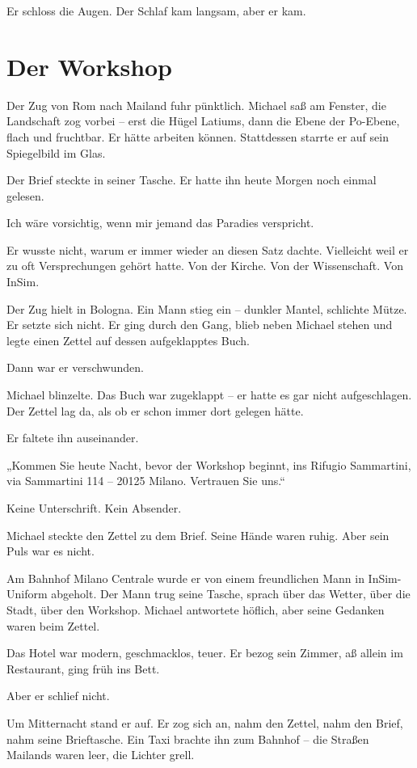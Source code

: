 \documentclass[
]{article}
\begin{document}
Er schloss die Augen. Der Schlaf kam langsam, aber er kam.

\section{Der Workshop}\label{der-workshop}

Der Zug von Rom nach Mailand fuhr pünktlich. Michael saß am Fenster, die Landschaft zog vorbei -- erst die Hügel Latiums, dann die Ebene der Po-Ebene, flach und fruchtbar. Er hätte arbeiten können. Stattdessen starrte er auf sein Spiegelbild im Glas.

Der Brief steckte in seiner Tasche. Er hatte ihn heute Morgen noch einmal gelesen.

Ich wäre vorsichtig, wenn mir jemand das Paradies verspricht.

Er wusste nicht, warum er immer wieder an diesen Satz dachte. Vielleicht weil er zu oft Versprechungen gehört hatte. Von der Kirche. Von der Wissenschaft. Von InSim.

Der Zug hielt in Bologna. Ein Mann stieg ein -- dunkler Mantel, schlichte Mütze. Er setzte sich nicht. Er ging durch den Gang, blieb neben Michael stehen und legte einen Zettel auf dessen aufgeklapptes Buch.

Dann war er verschwunden.

Michael blinzelte. Das Buch war zugeklappt -- er hatte es gar nicht aufgeschlagen. Der Zettel lag da, als ob er schon immer dort gelegen hätte.

Er faltete ihn auseinander.

„Kommen Sie heute Nacht, bevor der Workshop beginnt, ins Rifugio Sammartini, via Sammartini 114 -- 20125 Milano. Vertrauen Sie uns.``

Keine Unterschrift. Kein Absender.

Michael steckte den Zettel zu dem Brief. Seine Hände waren ruhig. Aber sein Puls war es nicht.

Am Bahnhof Milano Centrale wurde er von einem freundlichen Mann in InSim-Uniform abgeholt. Der Mann trug seine Tasche, sprach über das Wetter, über die Stadt, über den Workshop. Michael antwortete höflich, aber seine Gedanken waren beim Zettel.

Das Hotel war modern, geschmacklos, teuer. Er bezog sein Zimmer, aß allein im Restaurant, ging früh ins Bett.

Aber er schlief nicht.

Um Mitternacht stand er auf. Er zog sich an, nahm den Zettel, nahm den Brief, nahm seine Brieftasche. Ein Taxi brachte ihn zum Bahnhof -- die Straßen Mailands waren leer, die Lichter grell.
\end{document}
